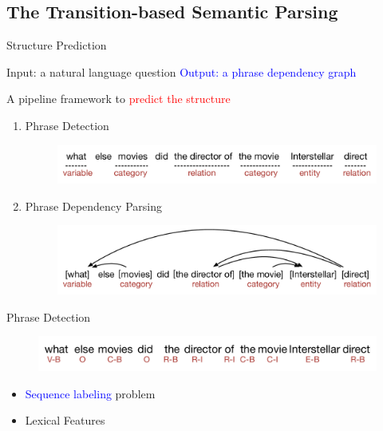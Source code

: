 \documentclass{beamer}
\begin{document}
\subsection{The Transition-based Semantic Parsing}
\begin{frame}{Structure Prediction}
		\begin{block}{Input: a natural language question}
		\textcolor{blue}{Output: a phrase dependency graph}
		\end{block}
		A pipeline framework to \textcolor{red}{predict the structure}
			\begin{enumerate}
			\item Phrase Detection
 			\begin{figure}
			\centering\includegraphics[width=1.0\textwidth]{introduction/DAGWithPhrase.pdf}
			\end{figure}
			\item Phrase Dependency Parsing
			\begin{figure}
			\centering\includegraphics[width=1.0\textwidth]{introduction/DAG.pdf}
			\end{figure}
			\end{enumerate}
\end{frame}

\begin{frame}{Phrase Detection}
	\begin{figure}
		\centering\includegraphics[width=1.0\textwidth]{introduction/phrase_detection.pdf}
	\end{figure}
	\begin{itemize}
		\item \textcolor{blue}{Sequence labeling} problem
		\item Lexical Features
	\end{itemize}
\end{frame}
\end{document}

